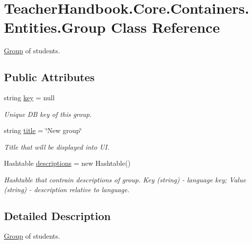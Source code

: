 \hypertarget{class_teacher_handbook_1_1_core_1_1_containers_1_1_entities_1_1_group}{}\section{Teacher\+Handbook.\+Core.\+Containers.\+Entities.\+Group Class Reference}
\label{class_teacher_handbook_1_1_core_1_1_containers_1_1_entities_1_1_group}


\mbox{\hyperlink{class_teacher_handbook_1_1_core_1_1_containers_1_1_entities_1_1_group}{Group}} of students.  


\subsection*{Public Attributes}
\begin{DoxyCompactItemize}
\item 
string \mbox{\hyperlink{class_teacher_handbook_1_1_core_1_1_containers_1_1_entities_1_1_group_a310647f18ded4bc06e52f6840b11d7ea}{key}} = null
\begin{DoxyCompactList}\small\item\em Unique DB key of this group. \end{DoxyCompactList}\item 
string \mbox{\hyperlink{class_teacher_handbook_1_1_core_1_1_containers_1_1_entities_1_1_group_a230fa40688f7bed7e0e6d2fada98665f}{title}} = \char`\"{}New group\char`\"{}
\begin{DoxyCompactList}\small\item\em Title that will be displayed into UI. \end{DoxyCompactList}\item 
Hashtable \mbox{\hyperlink{class_teacher_handbook_1_1_core_1_1_containers_1_1_entities_1_1_group_a7332027f3ea328914b304a88aa28b07f}{descriptions}} = new Hashtable()
\begin{DoxyCompactList}\small\item\em Hashtable that contrain descriptions of group. Key (string) -\/ language key; Value (string) -\/ description relative to language. \end{DoxyCompactList}\end{DoxyCompactItemize}


\subsection{Detailed Description}
\mbox{\hyperlink{class_teacher_handbook_1_1_core_1_1_containers_1_1_entities_1_1_group}{Group}} of students. 



